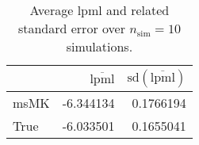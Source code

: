 \begin{table}[H]

\caption{Average lpml and related standard error over $n_{\text{sim}} = 10$ simulations.}
\centering
\begin{tabular}[t]{lrr}
\toprule
  & $\overbar{\text{lpml}}$ & $\text{sd}(\overbar{\text{lpml}})$\\
\midrule
msMK & -6.344134 & 0.1766194\\
True & -6.033501 & 0.1655041\\
\bottomrule
\end{tabular}
\end{table}